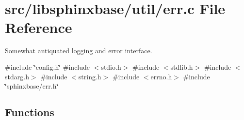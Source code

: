 \section{src/libsphinxbase/util/err.c \-File \-Reference}
\label{err_8c}


\-Somewhat antiquated logging and error interface.  


{\ttfamily \#include \char`\"{}config.\-h\char`\"{}}\*
{\ttfamily \#include $<$stdio.\-h$>$}\*
{\ttfamily \#include $<$stdlib.\-h$>$}\*
{\ttfamily \#include $<$stdarg.\-h$>$}\*
{\ttfamily \#include $<$string.\-h$>$}\*
{\ttfamily \#include $<$errno.\-h$>$}\*
{\ttfamily \#include \char`\"{}sphinxbase/err.\-h\char`\"{}}\*
\subsection*{\-Functions}

